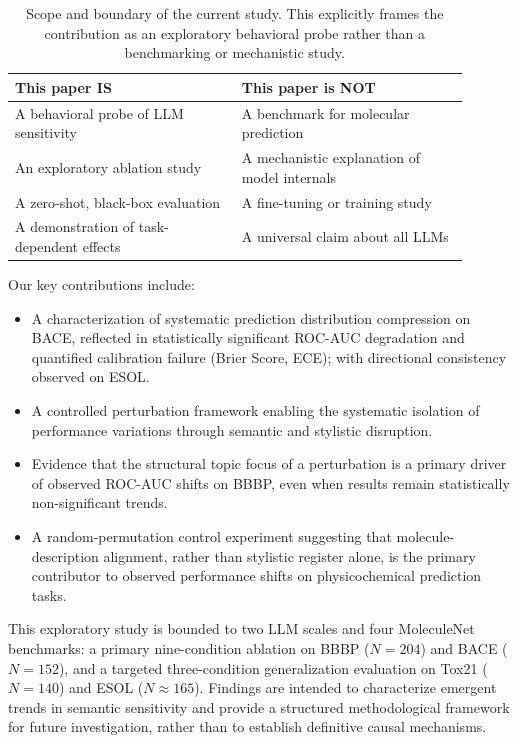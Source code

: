 \begin{table}[ht]
\centering
\caption{Scope and boundary of the current study. This explicitly frames the contribution as an exploratory behavioral probe rather than a benchmarking or mechanistic study.}
\label{tab:scope}
\begin{tabular}{p{0.45\linewidth} p{0.45\linewidth}}
\toprule
\textbf{This paper IS} & \textbf{This paper is NOT} \\
\midrule
A behavioral probe of LLM sensitivity & A benchmark for molecular prediction \\
An exploratory ablation study & A mechanistic explanation of model internals \\
A zero-shot, black-box evaluation & A fine-tuning or training study \\
A demonstration of task-dependent effects & A universal claim about all LLMs \\
\bottomrule
\end{tabular}
\end{table}

Our key contributions include:
\begin{itemize}
    \item A characterization of systematic prediction 
distribution compression on BACE, reflected in 
statistically significant ROC-AUC degradation and 
quantified calibration failure (Brier Score, ECE); 
with directional consistency observed on ESOL.
    \item A controlled perturbation framework enabling the systematic isolation of performance variations through semantic and stylistic disruption.
    \item Evidence that the structural topic focus of a perturbation is a primary driver of observed ROC-AUC shifts on BBBP, even when results remain statistically non-significant trends.
    \item A random-permutation control experiment suggesting that molecule-description alignment, rather than stylistic register alone, is the primary contributor to observed performance shifts on physicochemical prediction tasks.
\end{itemize}

This exploratory study is bounded to two LLM scales and 
four MoleculeNet benchmarks: a primary nine-condition 
ablation on BBBP ($N=204$) and BACE ($N=152$), and a 
targeted three-condition generalization evaluation on 
Tox21 ($N=140$) and ESOL ($N \approx 165$). Findings are 
intended to characterize emergent trends in semantic 
sensitivity and provide a structured methodological 
framework for future investigation, rather than to 
establish definitive causal mechanisms.
